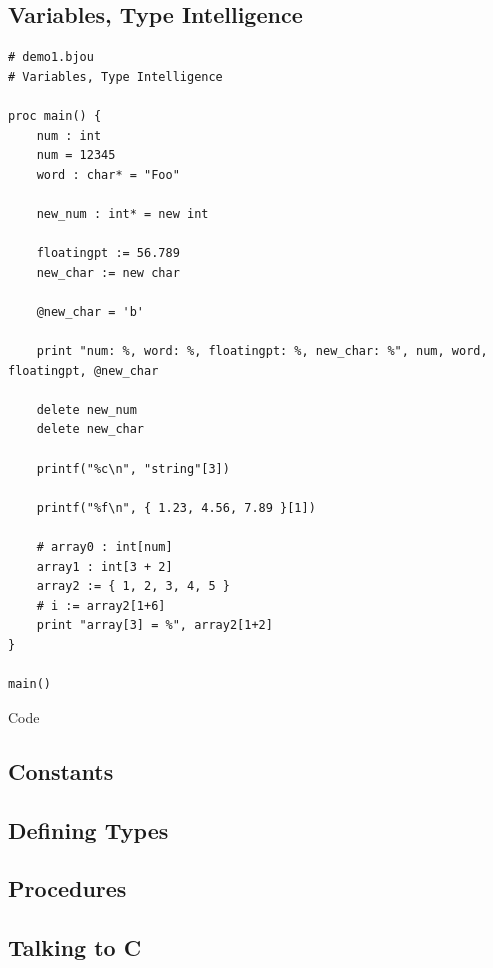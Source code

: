 \documentclass[12pt]{article}
\begin{document}
	\subsection*{Variables, Type Intelligence}
		\begin{centering}
			\begin{verbatim}
# demo1.bjou
# Variables, Type Intelligence

proc main() {
    num : int
    num = 12345
    word : char* = "Foo"
    			
    new_num : int* = new int
    				
    floatingpt := 56.789
    new_char := new char
    
    @new_char = 'b'
    									
    print "num: %, word: %, floatingpt: %, new_char: %", num, word, floatingpt, @new_char
    										
    delete new_num
    delete new_char
    												
    printf("%c\n", "string"[3])
    													
    printf("%f\n", { 1.23, 4.56, 7.89 }[1])
    														
    # array0 : int[num]
    array1 : int[3 + 2]
    array2 := { 1, 2, 3, 4, 5 }
    # i := array2[1+6]
    print "array[3] = %", array2[1+2]
}

main()
			\end{verbatim}
			\caption{Code}
		\end{centering}
	
	\subsection*{Constants}
	
	\subsection*{Defining Types}
	
	\subsection*{Procedures}

	\subsection*{Talking to C}
\end{document}
